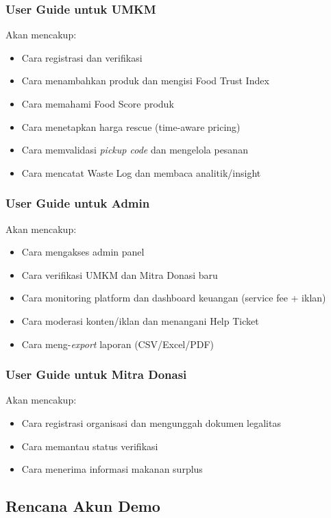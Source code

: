 \subsubsection{User Guide untuk UMKM}
Akan mencakup:
\begin{itemize}[leftmargin=*]
    \item Cara registrasi dan verifikasi
    \item Cara menambahkan produk dan mengisi Food Trust Index
    \item Cara memahami Food Score produk
    \item Cara menetapkan harga rescue (time-aware pricing)
    \item Cara memvalidasi \textit{pickup code} dan mengelola pesanan
    \item Cara mencatat Waste Log dan membaca analitik/insight
\end{itemize}

\subsubsection{User Guide untuk Admin}
Akan mencakup:
\begin{itemize}[leftmargin=*]
    \item Cara mengakses admin panel
    \item Cara verifikasi UMKM dan Mitra Donasi baru
    \item Cara monitoring platform dan dashboard keuangan (service fee + iklan)
    \item Cara moderasi konten/iklan dan menangani Help Ticket
    \item Cara meng-\textit{export} laporan (CSV/Excel/PDF)
\end{itemize}

\subsubsection{User Guide untuk Mitra Donasi}
Akan mencakup:
\begin{itemize}[leftmargin=*]
    \item Cara registrasi organisasi dan mengunggah dokumen legalitas
    \item Cara memantau status verifikasi
    \item Cara menerima informasi makanan surplus
\end{itemize}

\subsection{Rencana Akun Demo}

